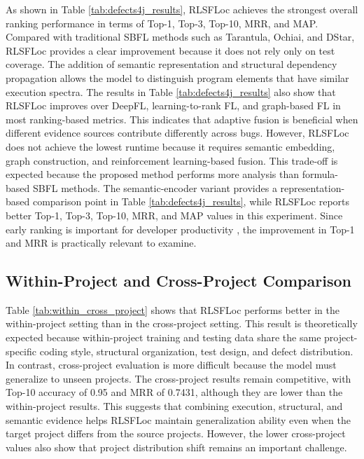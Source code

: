 \documentclass[article,article,submit,pdftex,moreauthors]{Definitions/mdpi}
\begin{document}
As shown in Table \ref{tab:defects4j_results}, RLSFLoc achieves the strongest overall ranking performance in terms of Top-1, Top-3, Top-10, MRR, and MAP. Compared with traditional SBFL methods such as Tarantula, Ochiai, and DStar, RLSFLoc provides a clear improvement because it does not rely only on test coverage. The addition of semantic representation and structural dependency propagation allows the model to distinguish program elements that have similar execution spectra. The results in Table \ref{tab:defects4j_results} also show that RLSFLoc improves over DeepFL, learning-to-rank FL, and graph-based FL in most ranking-based metrics. This indicates that adaptive fusion is beneficial when different evidence sources contribute differently across bugs. However, RLSFLoc does not achieve the lowest runtime because it requires semantic embedding, graph construction, and reinforcement learning-based fusion. This trade-off is expected because the proposed method performs more analysis than formula-based SBFL methods. The semantic-encoder variant provides a representation-based comparison point in Table \ref{tab:defects4j_results}, while RLSFLoc reports better Top-1, Top-3, Top-10, MRR, and MAP values in this experiment. Since early ranking is important for developer productivity \cite{parnin2011debugging,kochhar2016practitioners}, the improvement in Top-1 and MRR is practically relevant to examine.

\subsection{Within-Project and Cross-Project Comparison}

Table \ref{tab:within_cross_project} shows that RLSFLoc performs better in the within-project setting than in the cross-project setting. This result is theoretically expected because within-project training and testing data share the same project-specific coding style, structural organization, test design, and defect distribution. In contrast, cross-project evaluation is more difficult because the model must generalize to unseen projects. The cross-project results remain competitive, with Top-10 accuracy of 0.95 and MRR of 0.7431, although they are lower than the within-project results. This suggests that combining execution, structural, and semantic evidence helps RLSFLoc maintain generalization ability even when the target project differs from the source projects. However, the lower cross-project values also show that project distribution shift remains an important challenge.
\end{document}
